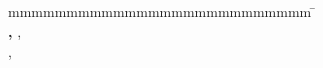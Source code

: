 
\begin{titlepage}
	
	
	\enlargethispage{20mm}
	\begin{center}
		\vspace*{12mm}	{\LARGE\textbf \titel }\\
		\vspace*{12mm}	{\large\textbf \arbeit}\\
		\vspace*{12mm}	\langdeckblattabschlusshinleitung\\
		\vspace*{3mm}		{\textbf \abschluss}\\
		\vspace*{12mm}	\langartikelstudiengang{} \langstudiengang{} \studiengang\\
    \vspace*{3mm}		\langanderdh{} \dhbw\\
		\vspace*{12mm}	\langvon\\
		\vspace*{3mm}		{\large\textbf \autor}\\
		\vspace*{12mm}	\datumAbgabe\\
	\end{center}
	\vfill
	\begin{spacing}{1.2}
	\begin{tabbing}
		mmmmmmmmmmmmmmmmmmmmmmmmmm             \= \kill
		\textbf{\langdbbearbeitungszeit}       \>  \zeitraum\\
		\textbf{\langdbmatriknr, \langdbkurs}  \>  \martrikelnr, \kurs\\
		\textbf{\langdbfirma}                  \>  \firma, \firmenort\\
		\textbf{\langdbbetreuer}               \>  \betreuer\\
		\textbf{\langdbgutachter}              \>  \gutachter
	\end{tabbing}
	\end{spacing}
\end{titlepage}
